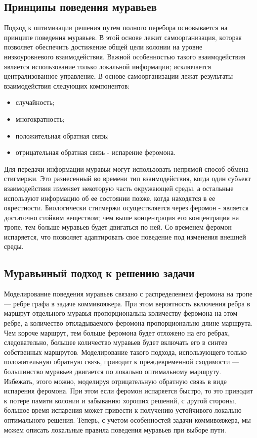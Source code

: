 \subsection{Принципы поведения муравьев}
Подход к оптимизации решения путем полного перебора основывается на принципе поведения муравьев. В этой основе лежит самоорганизация, которая позволяет обеспечить достижение общей цели колонии на уровне низкоуровневого взаимодействия. Важной особенностью такого взаимодействия является использование только локальной информации; исключается централизованное управление. В основе самоорганизации лежат результаты взаимодействия следующих компонентов:
\begin{itemize}
	\item случайность;
	\item многократность;
	\item положительная обратная связь;
	\item отрицательная обратная связь - испарение феромона.
\end{itemize}

Для передачи информации муравьи могут использовать непрямой способ обмена - стигмержи. Это разнесенный во времени тип взаимодействия, когда один субъект взаимодействия изменяет некоторую часть окружающей среды, а остальные используют информацию об ее состоянии позже, когда находятся в ее окрестности. Биологически стигмержи осуществляется через феромон - является достаточно стойким веществом; чем выше концентрация его концентрация на тропе, тем больше муравьев будет двигаться по ней. Со временем феромон испаряется, что позволяет адаптировать свое поведение под изменения внешней среды.

\subsection{Муравьиный подход к решению задачи}
Моделирование поведения муравьев связано с распределением феромона на тропе — ребре графа в задаче коммивояжера\cite{ant_2}. При этом вероятность включения ребра в маршрут отдельного муравья пропорциональна количеству феромона на этом ребре, а количество откладываемого феромона пропорционально длине маршрута. Чем короче маршрут, тем больше феромона будет отложено на его ребрах, следовательно, большее количество муравьев будет включать его в синтез собственных маршрутов. Моделирование такого подхода, использующего только положительную обратную связь, приводит к преждевременной сходимости — большинство муравьев двигается по локально оптимальному маршруту. Избежать, этого можно, моделируя отрицательную обратную связь в виде испарения феромона. При этом если феромон испаряется быстро, то это приводит к потере памяти колонии и забыванию хороших решений, с другой стороны, большое время испарения может привести к получению устойчивого локально оптимального решения. Теперь, с учетом особенностей задачи коммивояжера, мы можем описать локальные правила поведения муравьев при выборе пути.

